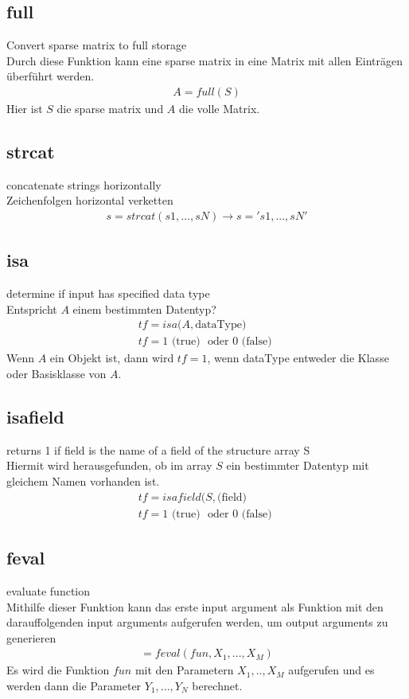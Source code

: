 \documentclass[12pt,bibstyle=none,pagenumberinfooter]{ifmdocument}
\begin{document}
	\subsection{full}
		\glqq Convert sparse matrix to full storage\grqq{}\\
		Durch diese Funktion kann eine \glqq sparse matrix\grqq{} in eine Matrix mit allen Eintr\"agen \"uberf\"uhrt werden.  
		\begin{gather*}
			A = full(S)
		\end{gather*}
		Hier ist $S$ die \glqq sparse matrix\grqq{} und $A$ die volle Matrix. 
	\subsection{strcat}
		\glqq concatenate strings horizontally\grqq{}\\
		Zeichenfolgen horizontal verketten
		\begin{gather*}
			s=strcat(s1, ... , sN) \rightarrow s = 's1, ... , sN'
		\end{gather*}
	\subsection{isa}
		\glqq determine if input has specified data type\grqq{}\\
		Entspricht $A$ einem bestimmten Datentyp?
		\begin{gather*}
			tf = isa(A,\text{dataType)} \\
			tf = 1 \text{ (true) } \text{ oder } 0 \text{ (false) }
		\end{gather*}
		Wenn $A$ ein Objekt ist, dann wird $tf=1$, wenn \glqq dataType\grqq{} entweder die Klasse oder Basisklasse von $A$.
	\subsection{isafield}
		\glqq  returns 1 if field is the name of a field of the structure array S\grqq{}\\
		Hiermit wird herausgefunden, ob im array $S$ ein bestimmter Datentyp mit gleichem Namen vorhanden ist.
		\begin{gather*}
			tf = isafield(S,\text{(field)} \\
			tf = 1 \text{ (true) } \text{ oder } 0 \text{ (false) }
		\end{gather*}
	\subsection{feval}
		\glqq evaluate function\grqq{}\\
		Mithilfe dieser Funktion kann das erste \glqq input argument\grqq{} als Funktion mit den darauffolgenden \glqq input arguments\grqq{} aufgerufen werden, um \glqq output arguments\grqq{} zu generieren
		\begin{gather*}
			[y_1, ..., y_N] = feval(fun, X_1, ..., X_M)
		\end{gather*}
		Es wird die Funktion $fun$ mit den Parametern $X_1, .., X_M$ aufgerufen und es werden dann die Parameter $Y_1, ..., Y_N$ berechnet. 
\end{document}
